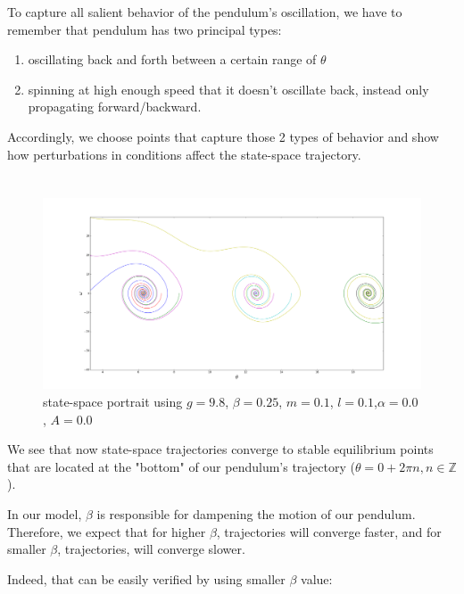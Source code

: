 \documentclass[12pt]{article}\pagestyle{myheadings}
\theoremstyle{plain}
\begin{document}
To capture all salient behavior of the pendulum's oscillation, we have to remember that pendulum has two principal types:
\begin{enumerate}
\item oscillating back and forth between a certain range of $\theta$
\item spinning at high enough speed that it doesn't oscillate back, instead only propagating forward/backward.
\end{enumerate}

Accordingly, we choose points that capture those 2 types of behavior and show how perturbations in conditions affect the state-space trajectory. 

\section{}

\begin{figure}[H]
\centering
\includegraphics[scale=.15]{4}
\caption{state-space portrait using $g = 9.8$, $\beta = 0.25$, $m = 0.1$, $l = 0.1$,$\alpha = 0.0$, $A = 0.0$}
\label{fig:my_label}
\end{figure}

We see that now state-space trajectories converge to stable equilibrium points that are located at the "bottom" of our pendulum's trajectory ($\theta = 0 + 2\pi n, n \in \mathbb{Z}$).

In our model, $\beta$ is responsible for dampening the motion of our pendulum. Therefore, we expect that for higher $\beta$, trajectories will converge faster, and for smaller $\beta$, trajectories, will converge slower. 

Indeed, that can be easily verified by using smaller $\beta$ value:
\end{document}
